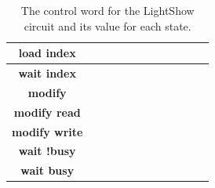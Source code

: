 \documentclass{article}[10 pt,landscape]
\begin{document}
\begin{landscape}
\begin{table}
{\begin{tabular}{c||c|c|c|c|c|c|c|c|c|c|c}
                {\bf load index } &      &      &       &       &       &      &      &      &   &   &   \\ \hline
                {\bf wait index } &      &      &      &       &       &      &      &      &   &      &   \\ \hline
                {\bf modify    } &      &      &      &       &       &      &      &      &   &      &   \\ \hline
                {\bf modify read} &      &      &      &       &       &      &      &      &   &      &   \\ \hline
                {\bf modify write } &      &      &      &       &       &      &      &       &   &      &   \\ \hline
                {\bf wait !busy } &      &      &      &       &       &      &      &      &   &      &   \\ \hline
                {\bf wait busy } &      &      &      &       &       &      &      &      &   &      &   \\
            \end{tabular}
        }
        \caption{The control word for the LightShow circuit and its value for each state.}
        \label{table:LightShow}
    \end{table}

\end{landscape}
\end{document}
